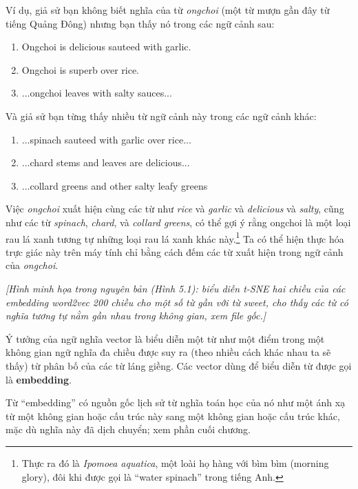 Ví dụ, giả sử bạn không biết nghĩa của từ \emph{ongchoi} (một từ mượn gần đây từ tiếng Quảng Đông) nhưng bạn thấy nó trong các ngữ cảnh sau:

\begin{enumerate}
  \item[(5.1)] Ongchoi is delicious sauteed with garlic.
  \item[(5.2)] Ongchoi is superb over rice.
  \item[(5.3)] ...ongchoi leaves with salty sauces...
\end{enumerate}

Và giả sử bạn từng thấy nhiều từ ngữ cảnh này trong các ngữ cảnh khác:

\begin{enumerate}
  \item[(5.4)] ...spinach sauteed with garlic over rice...
  \item[(5.5)] ...chard stems and leaves are delicious...
  \item[(5.6)] ...collard greens and other salty leafy greens
\end{enumerate}

Việc \emph{ongchoi} xuất hiện cùng các từ như \emph{rice} và \emph{garlic} và \emph{delicious} và \emph{salty}, cũng như các từ \emph{spinach}, \emph{chard}, và \emph{collard greens}, có thể gợi ý rằng ongchoi là một loại rau lá xanh tương tự những loại rau lá xanh khác này.\footnote{Thực ra đó là \emph{Ipomoea aquatica}, một loài họ hàng với bìm bìm (morning glory), đôi khi được gọi là ``water spinach'' trong tiếng Anh.} Ta có thể hiện thực hóa trực giác này trên máy tính chỉ bằng cách đếm các từ xuất hiện trong ngữ cảnh của \emph{ongchoi}.

\textit{[Hình minh họa trong nguyên bản (Hình 5.1): biểu diễn t-SNE hai chiều của các embedding word2vec 200 chiều cho một số từ gần với từ \emph{sweet}, cho thấy các từ có nghĩa tương tự nằm gần nhau trong không gian, xem file gốc.]}

Ý tưởng của ngữ nghĩa vector là biểu diễn một từ như một điểm trong một không gian ngữ nghĩa đa chiều được suy ra (theo nhiều cách khác nhau ta sẽ thấy) từ phân bố của các từ láng giềng. Các vector dùng để biểu diễn từ được gọi là \textbf{embedding}.

Từ ``embedding'' có nguồn gốc lịch sử từ nghĩa toán học của nó như một ánh xạ từ một không gian hoặc cấu trúc này sang một không gian hoặc cấu trúc khác, mặc dù nghĩa này đã dịch chuyển; xem phần cuối chương.

